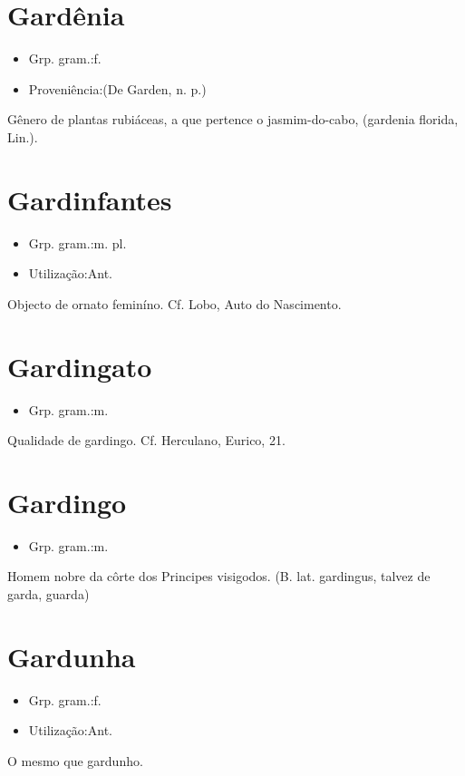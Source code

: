 \section{Gardênia}
\begin{itemize}
\item {Grp. gram.:f.}
\end{itemize}
\begin{itemize}
\item {Proveniência:(De \textunderscore Garden\textunderscore , n. p.)}
\end{itemize}
Gênero de plantas rubiáceas, a que pertence o \textunderscore jasmim-do-cabo\textunderscore , (\textunderscore gardenia florida\textunderscore , Lin.).
\section{Gardinfantes}
\begin{itemize}
\item {Grp. gram.:m. pl.}
\end{itemize}
\begin{itemize}
\item {Utilização:Ant.}
\end{itemize}
Objecto de ornato feminíno. Cf. Lobo, \textunderscore Auto do Nascimento\textunderscore .
\section{Gardingato}
\begin{itemize}
\item {Grp. gram.:m.}
\end{itemize}
Qualidade de gardingo. Cf. Herculano, \textunderscore Eurico\textunderscore , 21.
\section{Gardingo}
\begin{itemize}
\item {Grp. gram.:m.}
\end{itemize}
Homem nobre da côrte dos Principes visigodos.
(B. lat. \textunderscore gardingus\textunderscore , talvez de \textunderscore garda\textunderscore , guarda)
\section{Gardunha}
\begin{itemize}
\item {Grp. gram.:f.}
\end{itemize}
\begin{itemize}
\item {Utilização:Ant.}
\end{itemize}
O mesmo que \textunderscore gardunho\textunderscore .
